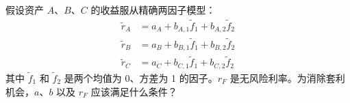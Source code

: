 \par\noindent\begin{minipage}{\linewidth}
\begin{problem}
 假设资产 $A$、$B$、$C$ 的收益服从精确两因子模型：
\ifdefined\WJExercisesOnly\setcounter{equation}{8}\fi
\begin{align}
    \widetilde r_{A}&=a_{A}+b_{A,1}\tilde{f}_{1}+b_{A,2}\tilde{f}_{2}\label{eq:wj-14-9}\\
    \widetilde r_{B}&=a_{B}+b_{B,1}\tilde{f}_{1}+b_{B,2}\tilde{f}_{2}\label{eq:wj-14-10}\\
    \widetilde r_{C}&=a_{C}+b_{C,1}\tilde{f}_{1}+b_{C,2}\tilde{f}_{2}\label{eq:wj-14-11}
\end{align}
其中 $\tilde{f}_{1}$ 和 $\tilde{f}_{2}$ 是两个均值为 0、方差为 1 的因子。$r_{F}$ 是无风险利率。为消除套利机会，$a$、$b$ 以及 $r_{F}$ 应该满足什么条件？
\end{problem}
\end{minipage}\par
{}
